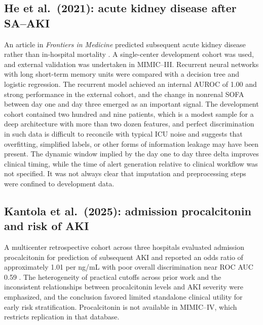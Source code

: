\subsection{He et al.\ (2021): acute kidney disease after SA--AKI}
An article in \emph{Frontiers in Medicine} predicted subsequent acute kidney disease rather than in-hospital mortality \citep{He_2021_FrontMed}. A single-center development cohort was used, and external validation was undertaken in MIMIC--III. Recurrent neural networks with long short-term memory units were compared with a decision tree and logistic regression. The recurrent model achieved an internal AUROC of 1.00 and strong performance in the external cohort, and the change in nonrenal SOFA between day one and day three emerged as an important signal. The development cohort contained two hundred and nine patients, which is a modest sample for a deep architecture with more than two dozen features, and perfect discrimination in such data is difficult to reconcile with typical ICU noise and suggests that overfitting, simplified labels, or other forms of information leakage may have been present. The dynamic window implied by the day one to day three delta improves clinical timing, while the time of alert generation relative to clinical workflow was not specified. It was not always clear that imputation and preprocessing steps were confined to development data.

\subsection{Kantola et al.\ (2025): admission procalcitonin and risk of AKI}
A multicenter retrospective cohort across three hospitals evaluated admission procalcitonin for prediction of subsequent AKI and reported an odds ratio of approximately 1.01 per ng/mL with poor overall discrimination near ROC AUC 0.59 \citep{Kantola_2025}. The heterogeneity of practical cutoffs across prior work and the inconsistent relationships between procalcitonin levels and AKI severity were emphasized, and the conclusion favored limited standalone clinical utility for early risk stratification. Procalcitonin is not available in MIMIC--IV, which restricts replication in that database.


